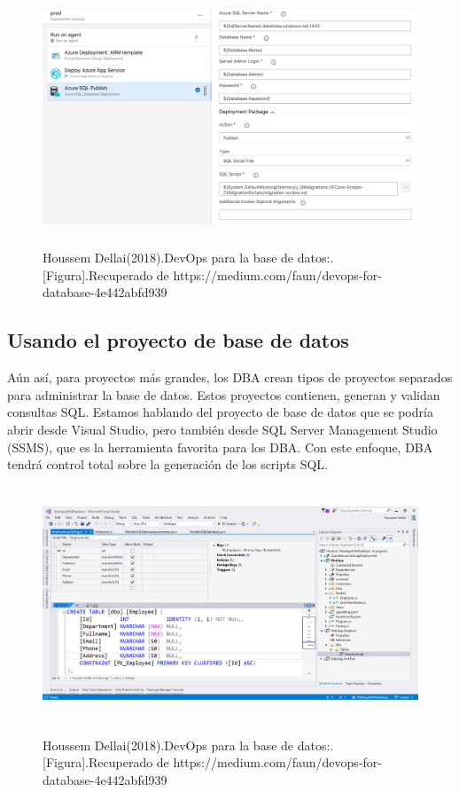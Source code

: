 \documentclass[preprint,12pt]{elsarticle}
\begin{document}
	\begin{figure}[H]
			\begin{center}
					\includegraphics[width=12cm,height=7cm]{./IMAGENES/analisis5}
			\end{center}
			Houssem Dellai(2018).DevOps para la base de datos:.[Figura].Recuperado de 
https://medium.com/faun/devops-for-database-4e442abfd939
		\end{figure}
\subsection {Usando el proyecto de base de datos}
Aún así, para proyectos más grandes, los DBA crean tipos de proyectos separados para administrar la base de datos. Estos proyectos contienen, generan y validan consultas SQL. Estamos hablando del proyecto de base de datos que se podría abrir desde Visual Studio, pero también desde SQL Server Management Studio (SSMS), que es la herramienta favorita para los DBA. Con este enfoque, DBA tendrá control total sobre la generación de los scripts SQL.

\begin{figure}[H]
			\begin{center}
					\includegraphics[width=12cm,height=7cm]{./IMAGENES/analisis6}
			\end{center}
			Houssem Dellai(2018).DevOps para la base de datos:.[Figura].Recuperado de 
https://medium.com/faun/devops-for-database-4e442abfd939
		\end{figure}
\end{document}
